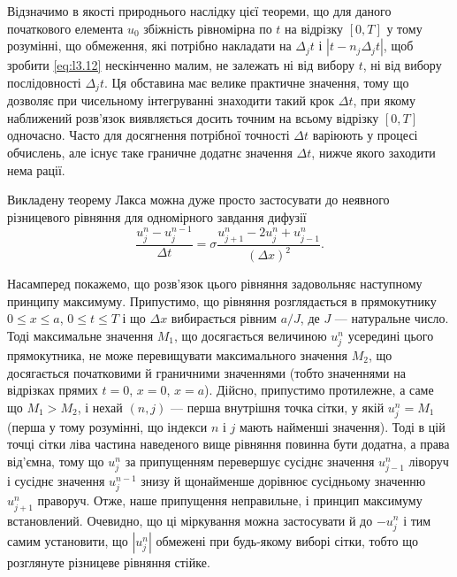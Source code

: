 Відзначимо в якості природнього наслідку цієї теореми, що для даного початкового елемента $u_0$ збіжність рівномірна по $t$ на відрізку $[0, T]$ у тому розумінні, що обмеження, які потрібно накладати на $\Delta_j t$ і $|t - n_j \Delta_j t|$, щоб зробити \eqref{eq:l3.12} нескінченно малим, не залежать ні від вибору $t$, ні від вибору послідовності $\Delta_j t$. Ця обставина має велике практичне значення, тому що дозволяє при чисельному інтегруванні знаходити такий крок $\Delta t$, при якому наближений розв'язок виявляється досить точним на всьому відрізку $[0, T]$ одночасно. Часто для досягнення потрібної точності $\Delta t$ варіюють у процесі обчислень, але існує таке граничне додатнє значення $\Delta t$, нижче якого заходити нема рації. \medskip

Викладену теорему Лакса можна дуже просто застосувати до неявного різницевого рівняння для одномірного завдання дифузії
\begin{equation}
    \frac{u_j^n - u_j^{n - 1}}{\Delta t} = \sigma \frac{u_{j + 1}^n - 2 u_j^n + u_{j - 1}^n}{(\Delta x)^2}.
\end{equation}
 
Насамперед  покажемо, що розв'язок цього рівняння задовольняє наступному принципу максимуму. Припустимо, що рівняння розглядається в прямокутнику $0 \le x \le a$, $0 \le t \le T$ і що $\Delta x$ вибирається рівним $a / J$, де $J$ --- натуральне число. Тоді максимальне значення $M_1$, що досягається величиною $u_j^n$ усередині цього прямокутника, не може перевищувати максимального значення $M_2$, що досягається початковими й граничними значеннями (тобто значеннями на відрізках прямих $t = 0$, $x = 0$, $x = a$). Дійсно, припустимо протилежне, а саме що $M_1 > M_2$, і нехай $(n,j)$ --- перша внутрішня точка сітки, у якій $u_j^n = M_1$ (перша у тому розумінні, що індекси $n$ і $j$ мають найменші значення). Тоді в цій точці сітки ліва частина наведеного вище рівняння повинна бути додатна, а права від'ємна, тому що $u_j^n$ за припущенням перевершує сусіднє значення $u_{j - 1}^n$ ліворуч і сусіднє значення $u_j^{n - 1}$ знизу й щонайменше дорівнює сусідньому значенню $u_{j + 1}^n$  праворуч. Отже, наше припущення неправильне, і принцип максимуму встановлений. Очевидно, що ці міркування можна застосувати й до $-u_j^n$ і тим самим установити, що $|u_j^n|$ обмежені при будь-якому виборі сітки, тобто що розглянуте різницеве рівняння стійке. \medskip


